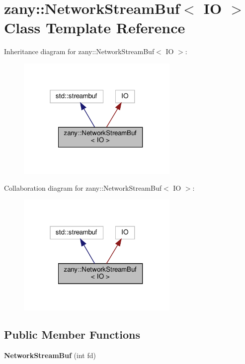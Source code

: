 \hypertarget{classzany_1_1_network_stream_buf}{}\section{zany\+:\+:Network\+Stream\+Buf$<$ IO $>$ Class Template Reference}
\label{classzany_1_1_network_stream_buf}


Inheritance diagram for zany\+:\+:Network\+Stream\+Buf$<$ IO $>$\+:
\nopagebreak
\begin{figure}[H]
\begin{center}
\leavevmode
\includegraphics[width=220pt]{classzany_1_1_network_stream_buf__inherit__graph}
\end{center}
\end{figure}


Collaboration diagram for zany\+:\+:Network\+Stream\+Buf$<$ IO $>$\+:
\nopagebreak
\begin{figure}[H]
\begin{center}
\leavevmode
\includegraphics[width=220pt]{classzany_1_1_network_stream_buf__coll__graph}
\end{center}
\end{figure}
\subsection*{Public Member Functions}
\begin{DoxyCompactItemize}
\item 
\mbox{\label{classzany_1_1_network_stream_buf_aa756b1380438bf2714c05a3f1c24d537}} 
{\bfseries Network\+Stream\+Buf} (int fd)
\end{DoxyCompactItemize}
